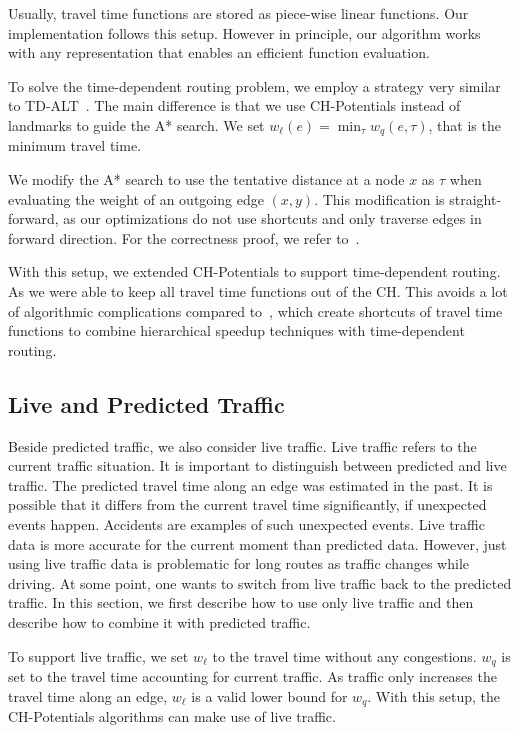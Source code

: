 \documentclass[letterpaper]{article} %
\begin{document}
Usually, travel time functions are stored as piece-wise linear functions.
Our implementation follows this setup.
However in principle, our algorithm works with any representation that enables an efficient function evaluation.

To solve the time-dependent routing problem, we employ a strategy very similar to TD-ALT~\cite{ndls-bastd-12}.
The main difference is that we use CH-Potentials instead of landmarks to guide the A* search.
We set $w_\ell(e) = \min_\tau w_q(e,\tau)$, that is the minimum travel time.

We modify the A* search to use the tentative distance at a node $x$ as $\tau$ when evaluating the weight of an outgoing edge $(x,y)$.
This modification is straight-forward, as our optimizations do not use shortcuts and only traverse edges in forward direction.
For the correctness proof, we refer to~\cite{dw-lbrdg-07}.

With this setup, we extended CH-Potentials to support time-dependent routing.
As we were able to keep all travel time functions out of the CH.
This avoids a lot of algorithmic complications compared to~\cite{bgsv-mtdtt-13,bdpw-dtdrp-16,swz-sfert-19}, which create shortcuts of travel time functions to combine hierarchical speedup techniques with time-dependent routing.

\subsection{Live and Predicted Traffic}
\label{sec:live-predicted-traffic}

Beside predicted traffic, we also consider live traffic.
Live traffic refers to the current traffic situation.
It is important to distinguish between predicted and live traffic.
The predicted travel time along an edge was estimated in the past.
It is possible that it differs from the current travel time significantly, if unexpected events happen.
Accidents are examples of such unexpected events.
Live traffic data is more accurate for the current moment than predicted data.
However, just using live traffic data is problematic for long routes as traffic changes while driving.
At some point, one wants to switch from live traffic back to the predicted traffic.
In this section, we first describe how to use only live traffic and then describe how to combine it with predicted traffic.

To support live traffic, we set $w_\ell$ to the travel time without any congestions.
$w_q$ is set to the travel time accounting for current traffic.
As traffic only increases the travel time along an edge, $w_\ell$ is a valid lower bound for $w_q$.
With this setup, the CH-Potentials algorithms can make use of live traffic.
\end{document}
